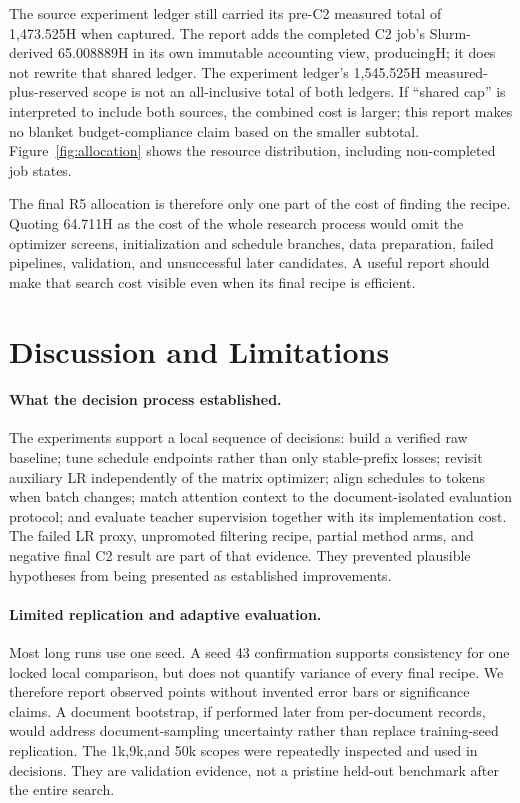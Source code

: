 The source experiment ledger still carried its pre-C2 measured total of 1,473.525H when captured. The report adds the completed C2 job's Slurm-derived 65.008889H in its own immutable accounting view, producing\ExperimentHours{}H; it does not rewrite that shared ledger. The experiment ledger's 1,545.525H measured-plus-reserved scope is not an all-inclusive total of both ledgers. If ``shared cap'' is interpreted to include both sources, the combined cost is larger; this report makes no blanket budget-compliance claim based on the smaller subtotal. Figure~\ref{fig:allocation} shows the resource distribution, including non-completed job states.

The final R5 allocation is therefore only one part of the cost of finding the recipe. Quoting 64.711H as the cost of the whole research process would omit the optimizer screens, initialization and schedule branches, data preparation, failed pipelines, validation, and unsuccessful later candidates. A useful report should make that search cost visible even when its final recipe is efficient.

\section{Discussion and Limitations}
\label{sec:discussion}

\paragraph{What the decision process established.}
The experiments support a local sequence of decisions: build a verified raw baseline; tune schedule endpoints rather than only stable-prefix losses; revisit auxiliary LR independently of the matrix optimizer; align schedules to tokens when batch changes; match attention context to the document-isolated evaluation protocol; and evaluate teacher supervision together with its implementation cost. The failed LR proxy, unpromoted filtering recipe, partial method arms, and negative final C2 result are part of that evidence. They prevented plausible hypotheses from being presented as established improvements.

\paragraph{Limited replication and adaptive evaluation.}
Most long runs use one seed. A seed 43 confirmation supports consistency for one locked local comparison, but does not quantify variance of every final recipe. We therefore report observed points without invented error bars or significance claims. A document bootstrap, if performed later from per-document records, would address document-sampling uncertainty rather than replace training-seed replication. The 1k,9k,and 50k scopes were repeatedly inspected and used in decisions. They are validation evidence, not a pristine held-out benchmark after the entire search.

